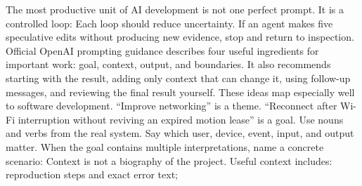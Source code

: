 \markdownRendererInterblockSeparator
{}The most productive unit of AI development is not one perfect prompt. It is a\markdownRendererSoftLineBreak
{}controlled loop:\markdownRendererInterblockSeparator
{}\markdownRendererInterblockSeparator
{}Each loop should reduce uncertainty. If an agent makes five speculative edits\markdownRendererSoftLineBreak
{}without producing new evidence, stop and return to inspection.\markdownRendererInterblockSeparator
{}\markdownRendererThematicBreak{}\markdownRendererInterblockSeparator
{}
\markdownRendererSectionEnd 
\markdownRendererSectionEnd \markdownRendererSectionBegin
{}\markdownRendererInterblockSeparator
{}Official OpenAI prompting guidance describes four useful ingredients for\markdownRendererSoftLineBreak
{}important work: goal, context, output, and boundaries. It also recommends\markdownRendererSoftLineBreak
{}starting with the result, adding only context that can change it, using\markdownRendererSoftLineBreak
{}follow-up messages, and reviewing the final result yourself. These ideas map\markdownRendererSoftLineBreak
{}especially well to software development.\markdownRendererInterblockSeparator
{}\markdownRendererSectionBegin
{}\markdownRendererInterblockSeparator
{}“Improve networking” is a theme. “Reconnect after Wi-Fi interruption without\markdownRendererSoftLineBreak
{}reviving an expired motion lease” is a goal. Use nouns and verbs from the real\markdownRendererSoftLineBreak
{}system. Say which user, device, event, input, and output matter.\markdownRendererParagraphSeparator
{}When the goal contains multiple interpretations, name a concrete scenario:\markdownRendererInterblockSeparator
{}\markdownRendererInterblockSeparator
{}
\markdownRendererSectionEnd \markdownRendererSectionBegin
{}\markdownRendererInterblockSeparator
{}Context is not a biography of the project. Useful context includes:\markdownRendererInterblockSeparator
{}\markdownRendererUlBegin
\markdownRendererUlItem reproduction steps and exact error text;\markdownRendererUlItemEnd 
